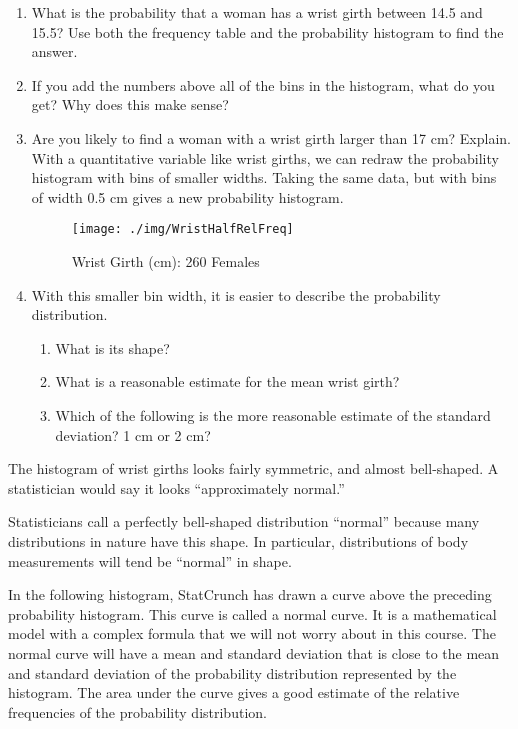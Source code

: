 \begin{enumerate}
\item What is the probability that a woman has a wrist girth between 14.5 and 15.5? Use both the frequency table and the probability histogram to find the answer.\\[.5cm]
\item If you add the numbers above all of the bins in the histogram, what do you get? Why does this make sense?\\[.5cm]
\item Are you likely to find a woman with a wrist girth larger than 17 cm? Explain.
\newpage
With a quantitative variable like wrist girths, we can redraw the probability histogram with bins of smaller widths. Taking the same data, but with bins of width 0.5 cm gives a new probability histogram.

\begin{figure}[H]
\centering{}\texttt{[image: ./img/WristHalfRelFreq]} \caption{Wrist Girth (cm): 260 Females}
\end{figure}
\item With this smaller bin width, it is easier to describe the probability distribution.
\begin{enumerate}
\item What is its shape?
\item What is a reasonable estimate for the mean wrist girth?
\item Which of the following is the more reasonable estimate of the standard deviation? 1 cm or 2 cm?
\end{enumerate}
\end{enumerate}

The histogram of wrist girths looks fairly symmetric, and almost bell-shaped. A statistician would say it looks ``approximately normal.''

Statisticians call a perfectly bell-shaped distribution ``normal'' because many distributions in nature have this shape. In particular, distributions of body measurements will tend be ``normal'' in shape.

In the following histogram, StatCrunch has drawn a curve above the preceding probability histogram. This curve is called a normal curve. It is a mathematical model with a complex formula that we will not worry about in this course. The normal curve will have a mean and standard deviation that is close to the mean and standard deviation of the probability distribution represented by the histogram. The area under the curve gives a good estimate of the relative frequencies of the probability distribution.

